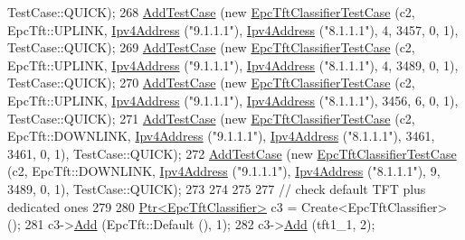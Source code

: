 \begin{DoxyCode}
      TestCase::QUICK);
268   \hyperlink{classns3_1_1TestCase_a3718088e3eefd5d6454569d2e0ddd835}{AddTestCase} (\textcolor{keyword}{new} \hyperlink{classEpcTftClassifierTestCase}{EpcTftClassifierTestCase} (c2, EpcTft::UPLINK,   
      \hyperlink{classns3_1_1Ipv4Address}{Ipv4Address} (\textcolor{stringliteral}{"9.1.1.1"}), \hyperlink{classns3_1_1Ipv4Address}{Ipv4Address} (\textcolor{stringliteral}{"8.1.1.1"}),     4,     3457,     0,    1), 
      TestCase::QUICK);
269   \hyperlink{classns3_1_1TestCase_a3718088e3eefd5d6454569d2e0ddd835}{AddTestCase} (\textcolor{keyword}{new} \hyperlink{classEpcTftClassifierTestCase}{EpcTftClassifierTestCase} (c2, EpcTft::UPLINK,   
      \hyperlink{classns3_1_1Ipv4Address}{Ipv4Address} (\textcolor{stringliteral}{"9.1.1.1"}), \hyperlink{classns3_1_1Ipv4Address}{Ipv4Address} (\textcolor{stringliteral}{"8.1.1.1"}),     4,     3489,     0,    1), 
      TestCase::QUICK);
270   \hyperlink{classns3_1_1TestCase_a3718088e3eefd5d6454569d2e0ddd835}{AddTestCase} (\textcolor{keyword}{new} \hyperlink{classEpcTftClassifierTestCase}{EpcTftClassifierTestCase} (c2, EpcTft::UPLINK,   
      \hyperlink{classns3_1_1Ipv4Address}{Ipv4Address} (\textcolor{stringliteral}{"9.1.1.1"}), \hyperlink{classns3_1_1Ipv4Address}{Ipv4Address} (\textcolor{stringliteral}{"8.1.1.1"}),  3456,        6,     0,    1), 
      TestCase::QUICK);
271   \hyperlink{classns3_1_1TestCase_a3718088e3eefd5d6454569d2e0ddd835}{AddTestCase} (\textcolor{keyword}{new} \hyperlink{classEpcTftClassifierTestCase}{EpcTftClassifierTestCase} (c2, EpcTft::DOWNLINK, 
      \hyperlink{classns3_1_1Ipv4Address}{Ipv4Address} (\textcolor{stringliteral}{"9.1.1.1"}), \hyperlink{classns3_1_1Ipv4Address}{Ipv4Address} (\textcolor{stringliteral}{"8.1.1.1"}),  3461,     3461,     0,    1), 
      TestCase::QUICK);
272   \hyperlink{classns3_1_1TestCase_a3718088e3eefd5d6454569d2e0ddd835}{AddTestCase} (\textcolor{keyword}{new} \hyperlink{classEpcTftClassifierTestCase}{EpcTftClassifierTestCase} (c2, EpcTft::DOWNLINK, 
      \hyperlink{classns3_1_1Ipv4Address}{Ipv4Address} (\textcolor{stringliteral}{"9.1.1.1"}), \hyperlink{classns3_1_1Ipv4Address}{Ipv4Address} (\textcolor{stringliteral}{"8.1.1.1"}),     9,     3489,     0,    1), 
      TestCase::QUICK);
273 
274   
275 
277   \textcolor{comment}{// check default TFT plus dedicated ones}
279 \textcolor{comment}{}
280   \hyperlink{classns3_1_1Ptr}{Ptr<EpcTftClassifier>} c3 = Create<EpcTftClassifier> ();
281   c3->\hyperlink{classns3_1_1EpcTftClassifier_a4a0dd2623dd9bfbfb806183625af74bd}{Add} (EpcTft::Default (), 1);
282   c3->\hyperlink{classns3_1_1EpcTftClassifier_a4a0dd2623dd9bfbfb806183625af74bd}{Add} (tft1\_1, 2);

\end{DoxyCode}

